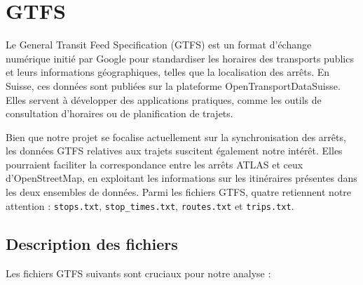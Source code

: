\section{GTFS}

Le General Transit Feed Specification (GTFS) est un format d’échange numérique initié par Google pour standardiser les horaires des transports publics et leurs informations géographiques, telles que la localisation des arrêts. En Suisse, ces données sont publiées sur la plateforme OpenTransportDataSuisse. Elles servent à développer des applications pratiques, comme les outils de consultation d’horaires ou de planification de trajets.

Bien que notre projet se focalise actuellement sur la synchronisation des arrêts, les données GTFS relatives aux trajets suscitent également notre intérêt. Elles pourraient faciliter la correspondance entre les arrêts ATLAS et ceux d’OpenStreetMap, en exploitant les informations sur les itinéraires présentes dans les deux ensembles de données. Parmi les  fichiers GTFS, quatre retiennent notre attention : \texttt{stops.txt}, \texttt{stop\_times.txt}, \texttt{routes.txt} et \texttt{trips.txt}.

\subsection{Description des fichiers}

Les fichiers GTFS suivants sont cruciaux pour notre analyse :

